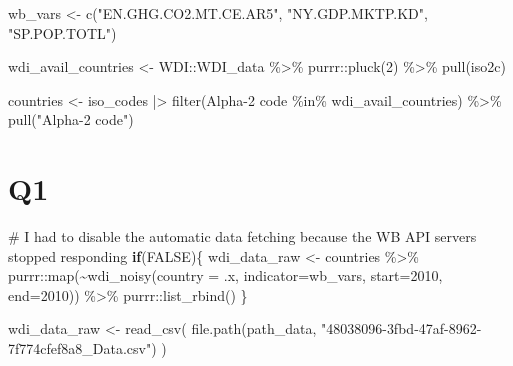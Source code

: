 \documentclass[
  letterpaper,
  DIV=11,
  numbers=noendperiod]{scrartcl}
\newenvironment{Shaded}{\begin{snugshade}}{\end{snugshade}}
\newcommand{\AttributeTok}[1]{\textcolor[rgb]{0.40,0.45,0.13}{#1}}
\newcommand{\CommentTok}[1]{\textcolor[rgb]{0.37,0.37,0.37}{#1}}
\newcommand{\ConstantTok}[1]{\textcolor[rgb]{0.56,0.35,0.01}{#1}}
\newcommand{\ControlFlowTok}[1]{\textcolor[rgb]{0.00,0.23,0.31}{\textbf{#1}}}
\newcommand{\DecValTok}[1]{\textcolor[rgb]{0.68,0.00,0.00}{#1}}
\newcommand{\FunctionTok}[1]{\textcolor[rgb]{0.28,0.35,0.67}{#1}}
\newcommand{\NormalTok}[1]{\textcolor[rgb]{0.00,0.23,0.31}{#1}}
\newcommand{\OtherTok}[1]{\textcolor[rgb]{0.00,0.23,0.31}{#1}}
\newcommand{\SpecialCharTok}[1]{\textcolor[rgb]{0.37,0.37,0.37}{#1}}
\newcommand{\StringTok}[1]{\textcolor[rgb]{0.13,0.47,0.30}{#1}}
\begin{document}
\begin{Shaded}
\begin{Highlighting}[]
\NormalTok{wb\_vars }\OtherTok{\textless{}{-}} \FunctionTok{c}\NormalTok{(}\StringTok{"EN.GHG.CO2.MT.CE.AR5"}\NormalTok{, }\StringTok{"NY.GDP.MKTP.KD"}\NormalTok{, }\StringTok{"SP.POP.TOTL"}\NormalTok{)}

\NormalTok{wdi\_avail\_countries }\OtherTok{\textless{}{-}} 
\NormalTok{  WDI}\SpecialCharTok{::}\NormalTok{WDI\_data }\SpecialCharTok{\%\textgreater{}\%}
\NormalTok{  purrr}\SpecialCharTok{::}\FunctionTok{pluck}\NormalTok{(}\DecValTok{2}\NormalTok{) }\SpecialCharTok{\%\textgreater{}\%} 
  \FunctionTok{pull}\NormalTok{(iso2c)}

\NormalTok{countries }\OtherTok{\textless{}{-}} 
\NormalTok{  iso\_codes }\SpecialCharTok{|\textgreater{}}
  \FunctionTok{filter}\NormalTok{(}\StringTok{\textasciigrave{}}\AttributeTok{Alpha{-}2 code}\StringTok{\textasciigrave{}} \SpecialCharTok{\%in\%}\NormalTok{ wdi\_avail\_countries) }\SpecialCharTok{\%\textgreater{}\%}
  \FunctionTok{pull}\NormalTok{(}\StringTok{"Alpha{-}2 code"}\NormalTok{)}
\end{Highlighting}
\end{Shaded}

\section{Q1}\label{q1}

\begin{Shaded}
\begin{Highlighting}[]
\CommentTok{\# I had to disable the automatic data fetching because the WB API servers stopped responding}
\ControlFlowTok{if}\NormalTok{(}\ConstantTok{FALSE}\NormalTok{)\{}
\NormalTok{wdi\_data\_raw }\OtherTok{\textless{}{-}} 
\NormalTok{  countries }\SpecialCharTok{\%\textgreater{}\%}
\NormalTok{  purrr}\SpecialCharTok{::}\FunctionTok{map}\NormalTok{(}\SpecialCharTok{\textasciitilde{}}\FunctionTok{wdi\_noisy}\NormalTok{(}\AttributeTok{country =}\NormalTok{ .x, }\AttributeTok{indicator=}\NormalTok{wb\_vars, }\AttributeTok{start=}\DecValTok{2010}\NormalTok{, }\AttributeTok{end=}\DecValTok{2010}\NormalTok{)) }\SpecialCharTok{\%\textgreater{}\%}
\NormalTok{  purrr}\SpecialCharTok{::}\FunctionTok{list\_rbind}\NormalTok{()}
\NormalTok{\}}

\NormalTok{wdi\_data\_raw }\OtherTok{\textless{}{-}}
  \FunctionTok{read\_csv}\NormalTok{(}
    \FunctionTok{file.path}\NormalTok{(path\_data, }\StringTok{"48038096{-}3fbd{-}47af{-}8962{-}7f774cfef8a8\_Data.csv"}\NormalTok{)}
\NormalTok{  )}
\end{Highlighting}
\end{Shaded}
\end{document}
